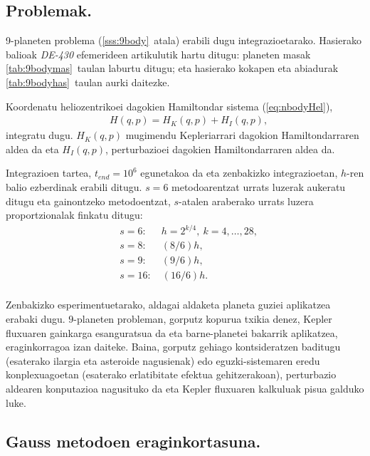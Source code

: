 \subsection{Problemak.}


9-planeten problema (\ref{sss:9body}~atala) erabili dugu integrazioetarako. Hasierako balioak \emph{DE-430} efemerideen artikulutik hartu ditugu: planeten masak  \ref{tab:9bodymas}~taulan laburtu ditugu; eta hasierako kokapen eta abiadurak \ref{tab:9bodyhas}~taulan aurki daitezke.

Koordenatu heliozentrikoei dagokien  Hamiltondar sistema (\ref{eq:nbodyHel}),
\begin{align*}
&H(q,p)=H_K(q,p)+H_I(q,p),
\end{align*}
integratu dugu. $H_K(q,p)$ mugimendu Kepleriarrari dagokion Hamiltondarraren aldea da  eta $H_I(q,p)$, perturbazioei dagokien Hamiltondarraren aldea da. 

Integrazioen tartea, $t_{end}=10^6$ egunetakoa da eta zenbakizko integrazioetan, $h$-ren balio ezberdinak erabili ditugu. $s=6$ metodoarentzat urrats luzerak aukeratu ditugu eta gainontzeko metodoentzat, $s$-atalen araberako urrats luzera proportzionalak finkatu ditugu:
\begin{align*}
&s=6: \quad  \ \ h=2^{k/4}, \ k=4,\dots,28, \\
&s=8: \quad  \ \ (8/6)h, \\
&s=9: \quad  \ \ (9/6)h, \\
&s=16: \quad (16/6)h. \\
\end{align*} 

Zenbakizko esperimentuetarako, aldagai aldaketa planeta guziei aplikatzea erabaki dugu. $9$-planeten probleman, gorputz kopurua txikia denez,  Kepler fluxuaren gainkarga esanguratsua da eta  barne-planetei bakarrik aplikatzea, eraginkorragoa izan daiteke. Baina, gorputz gehiago kontsideratzen baditugu (esaterako ilargia eta asteroide nagusienak) edo eguzki-sistemaren eredu konplexuagoetan (esaterako erlatibitate efektua gehitzerakoan), perturbazio aldearen konputazioa nagusituko da eta Kepler fluxuaren kalkuluak pisua galduko luke. 


\subsection*{Gauss metodoen eraginkortasuna.}



